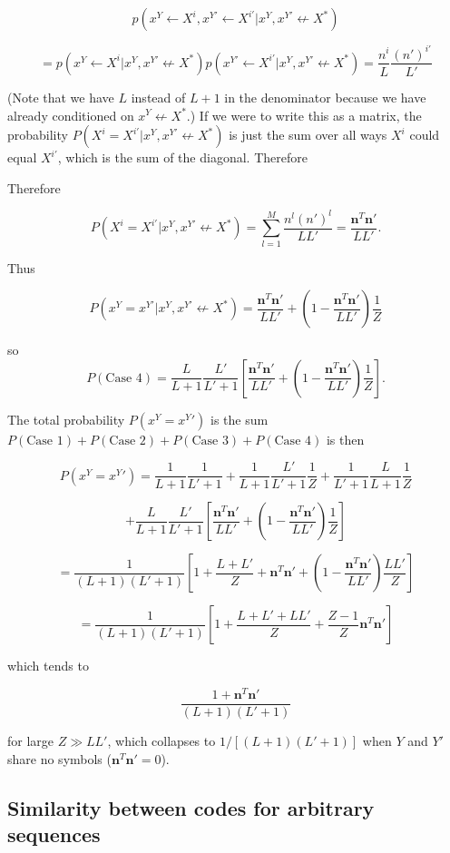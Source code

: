 \documentclass{article}
\begin{document}
$$p(x^Y \leftarrow X^i, x^{Y'} \leftarrow X^{i'}| x^Y, x^{Y'} \not \leftarrow X^*)$$

$$ = p(x^Y \leftarrow X^i| x^Y, x^{Y'} \not \leftarrow X^*)p(x^{Y'} \leftarrow X^{i'}| x^Y, x^{Y'} \not \leftarrow X^*)= \frac{n^i}{L}\frac{(n')^{i'}}{L'}$$

(Note that we have $L$ instead of $L + 1$ in the denominator because we have already conditioned on $x^Y \not \leftarrow X^*$.) If we were to write this as a matrix, the probability $P(X^i = X^{i'}| x^Y, x^{Y'} \not \leftarrow X^*)$ is just the sum over all ways $X^i$ could equal $X^{i'}$, which is the sum of the diagonal. Therefore

Therefore

$$P(X^i = X^{i'}| x^Y, x^{Y'} \not \leftarrow X^*) = \sum\limits_{l = 1}^M\frac{n^l(n')^l}{LL'} = \frac{\mathbf{n}^T\mathbf{n}'}{LL'}.$$

Thus 

$$P(x^Y = x^{Y'}| x^Y, x^{Y'} \not \leftarrow X^*) = \frac{\mathbf{n}^T\mathbf{n}'}{LL'} + \left(1 - \frac{\mathbf{n}^T\mathbf{n}'}{LL'}\right)\frac{1}{Z}$$

so 
$$P(\textrm{Case 4}) = \frac{L}{L+1}\frac{L'}{L'+1}\left[\frac{\mathbf{n}^T\mathbf{n}'}{LL'} + \left(1 - \frac{\mathbf{n}^T\mathbf{n}'}{LL'}\right)\frac{1}{Z}\right].$$

The total probability $P(x^Y = x^Y')$ is the sum $P(\textrm{Case 1}) + P(\textrm{Case 2}) + P(\textrm{Case 3}) + P(\textrm{Case 4})$ is then

$$P(x^Y = x^Y') = \frac{1}{L+1}\frac{1}{L'+1} + \frac{1}{L+1}\frac{L'}{L'+1}\frac{1}{Z} + \frac{1}{L'+1}\frac{L}{L+1}\frac{1}{Z}$$

$$ + \frac{L}{L+1}\frac{L'}{L'+1}\left[\frac{\mathbf{n}^T\mathbf{n}'}{LL'} + \left(1 - \frac{\mathbf{n}^T\mathbf{n}'}{LL'}\right)\frac{1}{Z}\right]$$

$$= \frac{1}{(L+1)(L'+1)}\left[1 + \frac{L + L'}{Z} + \mathbf{n}^T\mathbf{n}' + \left(1 - \frac{\mathbf{n}^T\mathbf{n}'}{LL'}\right)\frac{LL'}{Z}\right]$$

$$= \frac{1}{(L+1)(L'+1)}\left[1 + \frac{L + L' + LL'}{Z} + \frac{Z-1}{Z}\mathbf{n}^T\mathbf{n}'\right]$$

which tends to 

$$\frac{1 + \mathbf{n}^T\mathbf{n}'}{(L+1)(L'+1)}$$

for large $Z \gg LL'$, which collapses to $1/[(L+1)(L'+1)]$ when $Y$ and $Y'$ share no symbols ($\mathbf{n}^T\mathbf{n}' = 0$).

\subsection{Similarity between codes for arbitrary sequences}
\end{document}

